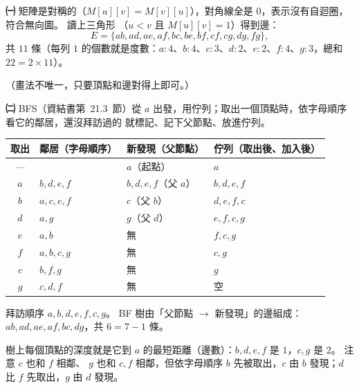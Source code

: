 \begin{pastsoln}
\textbf{㈠} 矩陣是對稱的（$M[u][v] = M[v][u]$），對角線全是 $0$，表示沒有自迴圈，符合無向圖。 讀上三角形
（$u < v$ 且 $M[u][v] = 1$）得到邊：
\[
E = \{ab, ad, ae, af, bc, be, bf, cf, cg, dg, fg\},
\]
共 $11$ 條（每列 $1$ 的個數就是度數：$a{:}4$、$b{:}4$、$c{:}3$、$d{:}2$、$e{:}2$、$f{:}4$、$g{:}3$，總和 $22 = 2 \times 11$）。
\begin{center}
\end{center}
（畫法不唯一，只要頂點和邊對得上即可。）

\textbf{㈡} BFS（資結書第~21.3~節）從 $a$ 出發，用佇列；取出一個頂點時，依字母順序看它的鄰居，還沒拜訪過的
就標記、記下父節點、放進佇列。
\begin{center}
\small
\begin{tabular}{clll}
\toprule
取出 & 鄰居（字母順序） & 新發現（父節點） & 佇列（取出後、加入後） \\
\midrule
--- & & $a$（起點） & $a$ \\
$a$ & $b, d, e, f$ & $b, d, e, f$（父 $a$） & $b, d, e, f$ \\
$b$ & $a, c, e, f$ & $c$（父 $b$） & $d, e, f, c$ \\
$d$ & $a, g$ & $g$（父 $d$） & $e, f, c, g$ \\
$e$ & $a, b$ & 無 & $f, c, g$ \\
$f$ & $a, b, c, g$ & 無 & $c, g$ \\
$c$ & $b, f, g$ & 無 & $g$ \\
$g$ & $c, d, f$ & 無 & 空 \\
\bottomrule
\end{tabular}
\end{center}
拜訪順序 $a, b, d, e, f, c, g$。 BF 樹由「父節點 $\to$ 新發現」的邊組成：$ab, ad, ae, af, bc, dg$，共 $6 = 7 - 1$ 條。
\begin{center}
\end{center}
樹上每個頂點的深度就是它到 $a$ 的最短距離（邊數）：$b, d, e, f$ 是 $1$，$c, g$ 是 $2$。 注意 $c$ 也和 $f$ 相鄰、
$g$ 也和 $c, f$ 相鄰，但依字母順序 $b$ 先被取出，$c$ 由 $b$ 發現；$d$ 比 $f$ 先取出，$g$ 由 $d$ 發現。
\end{pastsoln}
